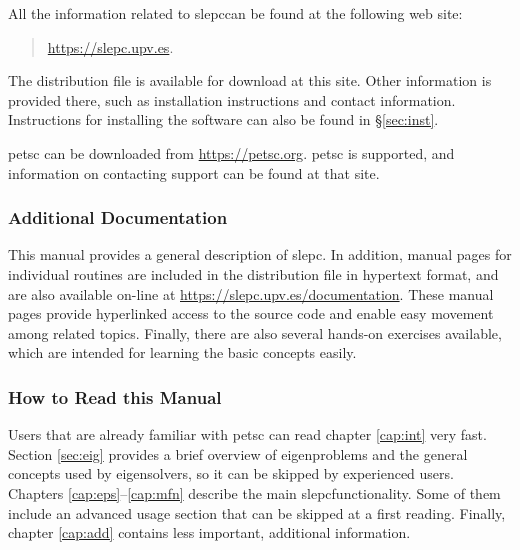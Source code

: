 \documentclass[titlepage,10pt,a4paper]{book}
\newcommand{\slepchome}{https://slepc.upv.es}
\newcommand{\packnoi}[1]{{\sc #1}\xspace}
\newcommand{\slepc}{\texorpdfstring{\packnoi{slep\rm c}}{{SLEPc}}}
\begin{document}
{	All the information related to \slepc can be found at the following web site:
	\begin{quote}
	\begin{center}
	\url{\slepchome}.
	\end{center}
	\end{quote}
	The distribution file is available for download at this site. Other information is provided there, such as installation instructions and contact information. Instructions for installing the software can also be found in \S\ref{sec:inst}.

	\packnoi{pets\rm c} can be downloaded from \url{https://petsc.org}.  \packnoi{pets\rm c} is supported, and information on contacting support can be found at that site.

\subsubsection*{Additional Documentation}

	This manual provides a general description of \slepc. In addition, manual pages for individual routines are included in the distribution file in hypertext format, and are also available on-line at \url{\slepchome/documentation}. These manual pages provide hyperlinked access to the source code and enable easy movement among related topics. Finally, there are also several hands-on exercises available, which are intended for learning the basic concepts easily.

\subsubsection*{How to Read this Manual}

	Users that are already familiar with \packnoi{pets\rm c} can read chapter \ref{cap:int} very fast. Section \ref{sec:eig} provides a brief overview of eigenproblems and the general concepts used by eigensolvers, so it can be skipped by experienced users. Chapters \ref{cap:eps}--\ref{cap:mfn} describe the main \slepc functionality. Some of them include an advanced usage section that can be skipped at a first reading. Finally, chapter \ref{cap:add} contains less important, additional information.

%

}
\end{document}
